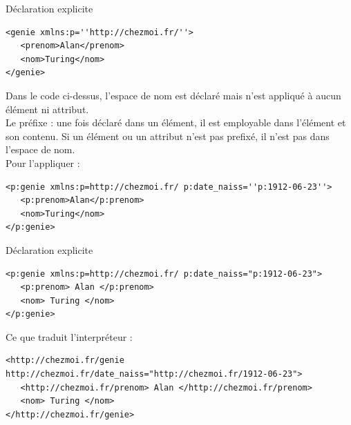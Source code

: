 \begin{frame}[containsverbatim]{D\'eclaration explicite}

\begin{lstlisting}[caption=D\'eclaration explicite d'un espace de nom]
<genie xmlns:p=''http://chezmoi.fr/''>
   <prenom>Alan</prenom>
   <nom>Turing</nom>
</genie>
\end{lstlisting}
Dans le code ci-dessus, l'espace de nom est déclaré mais n'est appliqué à aucun élément ni attribut. \\

Le préfixe : une fois déclaré dans un élément, il est employable dans l'élément et son contenu. 
Si un élément ou un attribut n'est pas prefixé, il n'est pas dans l'espace de nom.\\
Pour l'appliquer :

\begin{lstlisting}[caption=D\'eclaration explicite et application d'un espace de nom]
<p:genie xmlns:p=http://chezmoi.fr/ p:date_naiss=''p:1912-06-23''>
   <p:prenom>Alan</p:prenom>
   <nom>Turing</nom>
</p:genie>
\end{lstlisting}


\end{frame}


\begin{frame}[containsverbatim]{D\'eclaration explicite}

\begin{lstlisting}
<p:genie xmlns:p=http://chezmoi.fr/ p:date_naiss="p:1912-06-23">
   <p:prenom> Alan </p:prenom>
   <nom> Turing </nom>
</p:genie>
\end{lstlisting}

Ce que traduit l'interpréteur :

\begin{lstlisting}
<http://chezmoi.fr/genie http://chezmoi.fr/date_naiss="http://chezmoi.fr/1912-06-23">
   <http://chezmoi.fr/prenom> Alan </http://chezmoi.fr/prenom>
   <nom> Turing </nom>
</http://chezmoi.fr/genie>

\end{lstlisting}
\end{frame}



